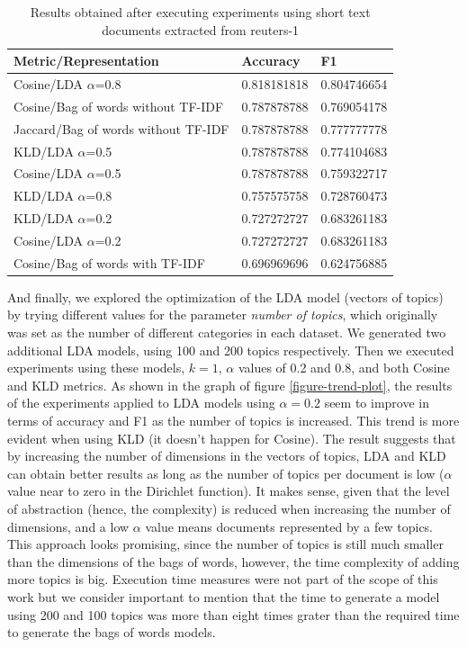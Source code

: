 \documentclass[preprint,12pt,3p]{elsarticle}
\begin{document}
\begin{table}[]
\centering
\caption{Results obtained after executing experiments using short text documents extracted from reuters-1}
\label{results-short-text}
\begin{tabular}{|l|l|l|}
\hline
\textbf{Metric/Representation}      & \textbf{Accuracy} & \textbf{F1} \\ \hline
Cosine/LDA $\alpha$=0.8             & 0.818181818       & 0.804746654 \\ \hline
Cosine/Bag of words without TF-IDF  & 0.787878788       & 0.769054178 \\ \hline
Jaccard/Bag of words without TF-IDF & 0.787878788       & 0.777777778 \\ \hline
KLD/LDA $\alpha$=0.5                & 0.787878788       & 0.774104683 \\ \hline
Cosine/LDA $\alpha$=0.5             & 0.787878788       & 0.759322717 \\ \hline
KLD/LDA $\alpha$=0.8                & 0.757575758       & 0.728760473 \\ \hline
KLD/LDA $\alpha$=0.2                & 0.727272727       & 0.683261183 \\ \hline
Cosine/LDA $\alpha$=0.2             & 0.727272727       & 0.683261183 \\ \hline
Cosine/Bag of words with TF-IDF     & 0.696969696       & 0.624756885 \\ \hline
\end{tabular}
\end{table}

And finally, we explored the optimization of the LDA model (vectors of topics) by trying different values for the parameter \textit{number of topics}, which originally was set as the number of different categories in each dataset. We generated two additional LDA models, using 100 and 200 topics respectively. Then we executed experiments using these models, $k=1$, $\alpha$ values of 0.2 and 0.8, and both Cosine and KLD metrics. As shown in the graph of figure \ref{figure-trend-plot}, the results of the experiments applied to LDA models using $\alpha=0.2$ seem to improve in terms of accuracy and F1 as the number of topics is increased. This trend is more evident when using KLD (it doesn't happen for Cosine). The result suggests that by increasing the number of dimensions in the vectors of topics, LDA and KLD can obtain better results as long as the number of topics per document is low ($\alpha$ value near to zero in the Dirichlet function). It makes sense, given that the level of abstraction (hence, the complexity) is reduced when increasing the number of dimensions, and a low $\alpha$ value means documents represented by a few topics. This approach looks promising, since the number of topics is still much smaller than the dimensions of the bags of words, however, the time complexity of adding more topics is big. Execution time measures were not part of the scope of this work but we consider important to mention that the time to generate a model using 200 and 100 topics was more than eight times grater than the required time to generate the bags of words models.
\end{document}

